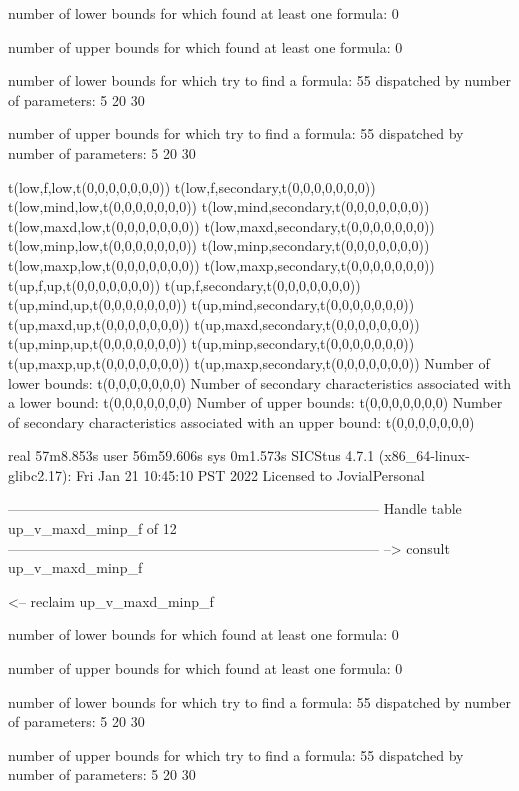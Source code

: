 number of lower bounds for which found at least one formula: 0

number of upper bounds for which found at least one formula: 0

number of lower bounds for which try to find a formula: 55
dispatched by number of parameters: 5  20  30

number of upper bounds for which try to find a formula: 55
dispatched by number of parameters: 5  20  30

t(low,f,low,t(0,0,0,0,0,0,0))
t(low,f,secondary,t(0,0,0,0,0,0,0))
t(low,mind,low,t(0,0,0,0,0,0,0))
t(low,mind,secondary,t(0,0,0,0,0,0,0))
t(low,maxd,low,t(0,0,0,0,0,0,0))
t(low,maxd,secondary,t(0,0,0,0,0,0,0))
t(low,minp,low,t(0,0,0,0,0,0,0))
t(low,minp,secondary,t(0,0,0,0,0,0,0))
t(low,maxp,low,t(0,0,0,0,0,0,0))
t(low,maxp,secondary,t(0,0,0,0,0,0,0))
t(up,f,up,t(0,0,0,0,0,0,0))
t(up,f,secondary,t(0,0,0,0,0,0,0))
t(up,mind,up,t(0,0,0,0,0,0,0))
t(up,mind,secondary,t(0,0,0,0,0,0,0))
t(up,maxd,up,t(0,0,0,0,0,0,0))
t(up,maxd,secondary,t(0,0,0,0,0,0,0))
t(up,minp,up,t(0,0,0,0,0,0,0))
t(up,minp,secondary,t(0,0,0,0,0,0,0))
t(up,maxp,up,t(0,0,0,0,0,0,0))
t(up,maxp,secondary,t(0,0,0,0,0,0,0))
Number of lower bounds:                                             t(0,0,0,0,0,0,0)
Number of secondary characteristics associated with a lower bound:  t(0,0,0,0,0,0,0)
Number of upper bounds:                                             t(0,0,0,0,0,0,0)
Number of secondary characteristics associated with an upper bound: t(0,0,0,0,0,0,0)

real	57m8.853s
user	56m59.606s
sys	0m1.573s
SICStus 4.7.1 (x86_64-linux-glibc2.17): Fri Jan 21 10:45:10 PST 2022
Licensed to JovialPersonal


--------------------------------------------------------------------------------
Handle table up_v_maxd_minp_f of 12
--------------------------------------------------------------------------------
--> consult up_v_maxd_minp_f

<-- reclaim up_v_maxd_minp_f

number of lower bounds for which found at least one formula: 0

number of upper bounds for which found at least one formula: 0

number of lower bounds for which try to find a formula: 55
dispatched by number of parameters: 5  20  30

number of upper bounds for which try to find a formula: 55
dispatched by number of parameters: 5  20  30

